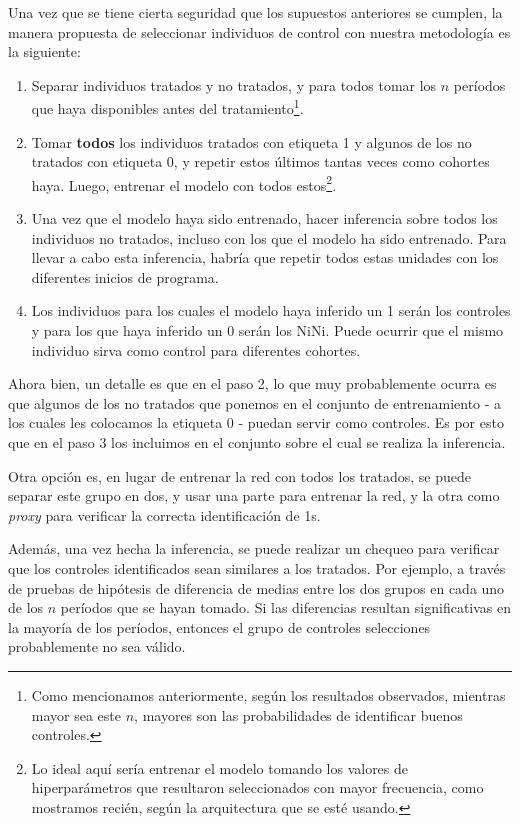 \documentclass[../main.tex]{subfiles}
\begin{document}
Una vez que se tiene cierta seguridad que los supuestos anteriores se cumplen, la manera
propuesta de seleccionar individuos de control con nuestra metodología es la siguiente:
\begin{enumerate}[itemsep=0.1cm, label=\textbf{\arabic*.}]
    \item Separar individuos tratados y no tratados, y para todos tomar los \(n\) períodos
    que haya disponibles antes del tratamiento\footnote{Como mencionamos anteriormente,
    según los resultados observados, mientras mayor sea este \(n\), mayores son las
    probabilidades de identificar buenos controles.}.
    \item Tomar \textbf{todos} los individuos tratados con etiqueta 1 y algunos de los no
    tratados con etiqueta 0, y repetir estos últimos tantas veces como cohortes haya.
    Luego, entrenar el modelo con todos estos\footnote{Lo ideal aquí sería entrenar el
    modelo tomando los valores de hiperparámetros que resultaron seleccionados con mayor
    frecuencia, como mostramos recién, según la arquitectura que se esté usando.}.
    \item Una vez que el modelo haya sido entrenado, hacer inferencia sobre todos los
    individuos no tratados, incluso con los que el modelo ha sido entrenado. Para llevar a
    cabo esta inferencia, habría que repetir todos estas unidades con los diferentes
    inicios de programa.
    \item Los individuos para los cuales el modelo haya inferido un 1 serán los controles
    y para los que haya inferido un 0 serán los NiNi. Puede ocurrir que el mismo individuo
    sirva como control para diferentes cohortes.
\end{enumerate}

Ahora bien, un detalle es que en el paso 2, lo que muy probablemente ocurra es que algunos
de los no tratados que ponemos en el conjunto de entrenamiento - a los cuales les
colocamos la etiqueta 0 - puedan servir como controles. Es por esto que en el paso 3
los incluimos en el conjunto sobre el cual se realiza la inferencia.

Otra opción es, en lugar de entrenar la red con todos los tratados, se puede separar
este grupo en dos, y usar una parte para entrenar la red, y la otra como \textit{proxy}
para verificar la correcta identificación de 1s.

Además, una vez hecha la inferencia, se puede realizar un chequeo para verificar que los
controles identificados sean similares a los tratados. Por ejemplo, a través de pruebas de
hipótesis de diferencia de medias entre los dos grupos en cada uno de los \(n\) períodos
que se hayan tomado. Si las diferencias resultan significativas en la mayoría de los
períodos, entonces el grupo de controles selecciones probablemente no sea válido.
\end{document}
